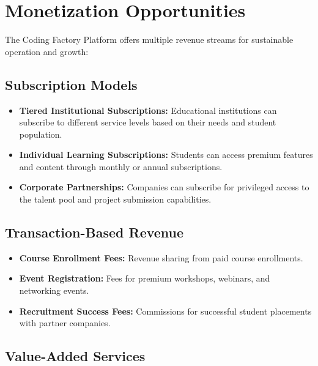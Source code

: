 \documentclass[12pt,a4paper]{report}
\begin{document}
\section{Monetization Opportunities}

The Coding Factory Platform offers multiple revenue streams for sustainable operation and growth:

\subsection{Subscription Models}

\begin{itemize}
    \item \textbf{Tiered Institutional Subscriptions:} Educational institutions can subscribe to different service levels based on their needs and student population.

    \item \textbf{Individual Learning Subscriptions:} Students can access premium features and content through monthly or annual subscriptions.

    \item \textbf{Corporate Partnerships:} Companies can subscribe for privileged access to the talent pool and project submission capabilities.
\end{itemize}

\subsection{Transaction-Based Revenue}

\begin{itemize}
    \item \textbf{Course Enrollment Fees:} Revenue sharing from paid course enrollments.

    \item \textbf{Event Registration:} Fees for premium workshops, webinars, and networking events.

    \item \textbf{Recruitment Success Fees:} Commissions for successful student placements with partner companies.
\end{itemize}

\subsection{Value-Added Services}
\end{document}
